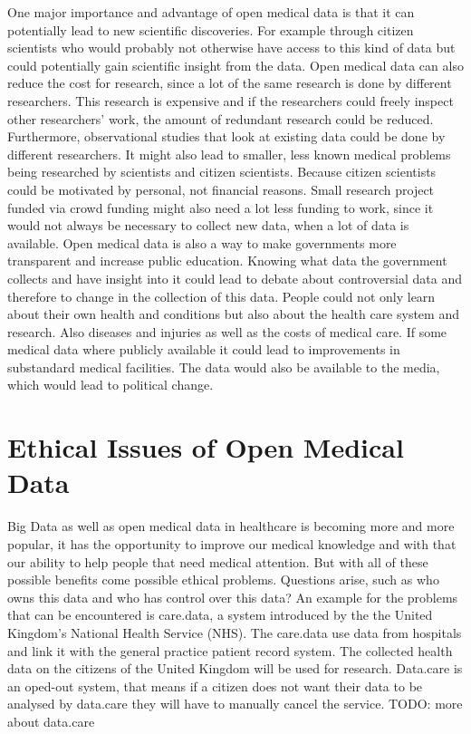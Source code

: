 \documentclass[a4paper, 11pt]{article}
\begin{document}
One major importance and advantage of open medical data is that it can potentially lead to new scientific discoveries. For example through citizen scientists who would probably not otherwise have access to this kind of data but could potentially gain scientific insight from the data. \cite{Hoffman2015}
Open medical data can also reduce the cost for research, since a lot of the same research is done by different researchers. This research is expensive and if the researchers could freely inspect other researchers' work, the amount of redundant research could be reduced. Furthermore, observational studies that look at existing data could be done by different researchers. It might also lead to smaller, less known medical problems being researched by scientists and citizen scientists. Because citizen scientists could be motivated by personal, not financial reasons. Small research project funded via crowd funding might also need a lot less funding to work, since it would not always be necessary to collect new data, when a lot of data is available. \cite{Hoffman2015}
Open medical data is also a way to make governments more transparent and increase public education. Knowing what data the government collects and have insight into it could lead to debate about controversial data and therefore to change in the collection of this data. People could not only learn about their own health and conditions but also about the health care system and research. Also diseases and injuries as well as the costs of medical care. If some medical data where publicly available it could lead to improvements in substandard medical facilities. The data would also be available to the media, which would lead to political change. \cite{Hoffman2015}

\section{Ethical Issues of Open Medical Data}\label{sec:ethicalIssues}
Big Data as well as open medical data in healthcare is becoming more and more popular, it has the opportunity to improve our medical knowledge and with that our ability to help people that need medical attention. But with all of these possible benefits come possible ethical problems. Questions arise, such as who owns this data and who has control over this data? An example for the problems that can be encountered is care.data, a system introduced by the the United Kingdom's National Health Service (NHS). \cite{Kostkova_et_al_2016} The care.data use data from hospitals and link it with the general practice patient record system. The collected health data on the citizens of the United Kingdom will be used for research. Data.care is an oped-out system, that means if a citizen does not want their data to be analysed by data.care they will have to manually cancel the service. \cite{Hoeksmag2014}
TODO: more about data.care 
\end{document}
